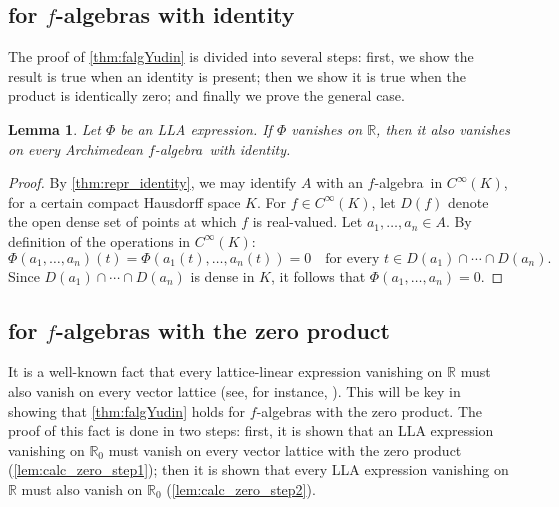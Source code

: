 \documentclass{memo-l}
\newtheorem{lem}[theorem]{Lemma}
\theoremstyle{definition}
\theoremstyle{remark}
\numberwithin{section}{chapter}
\numberwithin{equation}{chapter}
\newcommand\R{\ensuremath{\mathbb{R}}}
\newcommand{\falg}{$f\!$-algebra}
\begin{document}
\subsection{ for \falg s with identity}

The proof of \cref{thm:falgYudin} is divided into several steps: first,
we show the result is true when an identity is present; then we show
it is true when the product is identically zero; and finally we prove
the general case.

\begin{lem}\label{lem:calc_identity}
    Let $\Phi $ be an LLA expression. If $\Phi $ vanishes on $\R$,
    then it also vanishes on every Archimedean \falg\ with identity.
\end{lem}
\begin{proof}
    By \cref{thm:repr_identity}, we may identify $A$ with an \falg\
    in $C^{\infty }(K)$, for a certain compact Hausdorff space $K$.
    For $f \in C^{\infty }(K)$, let $D(f)$ denote the open dense set
    of points at which $f$ is real-valued. Let $a_1,\ldots ,a_n \in
    A$. By definition of the operations in $C^{\infty }(K)$:
    \[
    \Phi (a_1,\ldots ,a_n)(t)=\Phi (a_1(t),\ldots
    ,a_n(t))=0\quad\text{for every }t \in D(a_1)\cap \cdots \cap
    D(a_n).
    \]
    Since $D(a_1)\cap \cdots \cap D(a_n)$ is dense in $K$, it follows
    that $\Phi (a_1,\ldots ,a_n)=0$.
\end{proof}

\subsection{ for \falg s with the zero product}

It is a well-known fact that every lattice-linear expression vanishing on $\R$
must also vanish on every vector lattice (see, for instance,
\cite{baker1968}). This will be key in showing that
\cref{thm:falgYudin} holds for \falg s with the zero product. The
proof of this fact is done in two steps: first, it is
shown that an LLA expression vanishing on $\R_0$ must vanish on
every vector lattice with the zero product
(\cref{lem:calc_zero_step1}); then it is shown that every LLA
expression vanishing on $\R$ must also vanish on $\R_0$
(\cref{lem:calc_zero_step2}).
\end{document}
